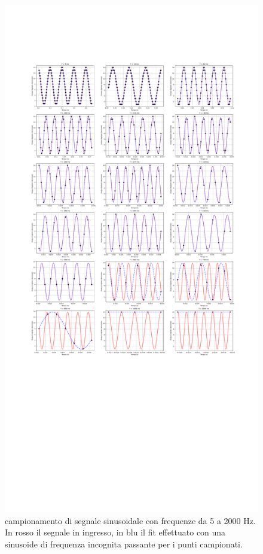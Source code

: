\documentclass[journal]{IEEEtran}
\begin{document}
\begin{figure}[t]%
\centering
\includegraphics[trim = {150 0 0 400}, width=1.1\textwidth]{analysis/output/cumulative_nyquist_mcu.pdf}
\caption{campionamento di segnale sinusoidale con frequenze da 5 a 2000 Hz. In rosso il segnale in ingresso, in blu il fit effettuato con una sinusoide di frequenza incognita passante per i punti campionati.}
\label{fig:nyquist_mcu_cumulative}
\end{figure}
\end{document}

